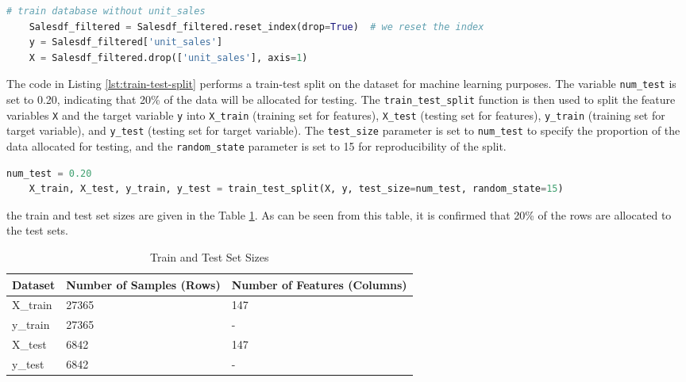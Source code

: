 \begin{lstlisting}[language=Python, caption={Preparing the training database}, label={lst:train-database}]
	# train database without unit_sales
	Salesdf_filtered = Salesdf_filtered.reset_index(drop=True)  # we reset the index
	y = Salesdf_filtered['unit_sales']
	X = Salesdf_filtered.drop(['unit_sales'], axis=1)
\end{lstlisting}



The code in Listing \ref{lst:train-test-split} performs a train-test split on the dataset for machine learning purposes. The variable \lstinline{num_test} is set to 0.20, indicating that 20\% of the data will be allocated for testing. The \lstinline{train_test_split} function is then used to split the feature variables \lstinline{X} and the target variable \lstinline{y} into \lstinline{X_train} (training set for features), \lstinline{X_test} (testing set for features), \lstinline{y_train} (training set for target variable), and \lstinline{y_test} (testing set for target variable). The \lstinline{test_size} parameter is set to \lstinline{num_test} to specify the proportion of the data allocated for testing, and the \lstinline{random_state} parameter is set to 15 for reproducibility of the split. 

\begin{lstlisting}[language=Python, caption={Train-test split of the dataset}, label={lst:train-test-split}]
	num_test = 0.20
	X_train, X_test, y_train, y_test = train_test_split(X, y, test_size=num_test, random_state=15)
\end{lstlisting}

the train and test set sizes are given in the Table \ref{tab:data-split}. As can be seen from this table, it is confirmed that 20\% of the rows are allocated to the test sets. 


\begin{table}[!h]
	\centering
	\caption{Train and Test Set Sizes}
	\label{tab:data-split}
	\begin{tabular}{|l|p{3cm}|p{3cm}|}
		\hline
		\textbf{Dataset} & \textbf{Number of Samples (Rows)} & \textbf{Number of Features (Columns)} \\
		\hline
		X\_train & 27365 & 147 \\
		y\_train & 27365 & - \\
		X\_test & 6842 & 147 \\
		y\_test & 6842 & - \\
		\hline
	\end{tabular}
\end{table}


